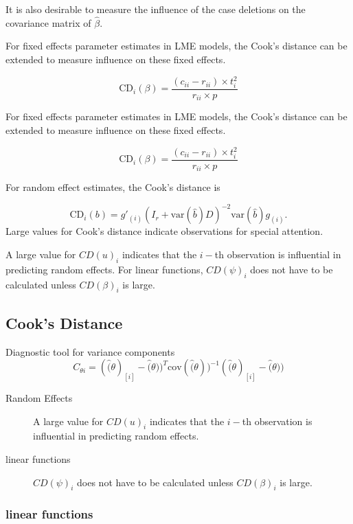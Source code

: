 \documentclass[12pt, a4paper]{report}
\theoremstyle{plain}
\theoremstyle{definition}
\theoremstyle{remark}
\begin{document}
It is also desirable to measure the influence of the case deletions on the covariance matrix of $\hat{\beta}$.

For fixed effects parameter estimates in LME models, the  Cook's distance can be extended to measure influence on these fixed effects.

\[
\mbox{CD}_{i}(\beta) = \frac{(c_{ii} - r_{ii}) \times t^2_{i}}{r_{ii} \times p}
\]


For fixed effects parameter estimates in LME models, the  Cook's distance can be extended to measure influence on these fixed effects.

\[
\mbox{CD}_{i}(\beta) = \frac{(c_{ii} - r_{ii}) \times t^2_{i}}{r_{ii} \times p}
\]

For random effect estimates, the  Cook's distance is

\[
\mbox{CD}_{i}(b) = g{\prime}_{(i)} (I_{r} + \mbox{var}(\hat{b})D)^{-2}\mbox{var}(\hat{b})g_{(i)}.
\]
Large values for Cook's distance indicate observations for special attention.

A large value for $CD(u)_i$ indicates that the $i-$th observation is influential in predicting random effects.
For linear functions, $CD(\psi)_i$ does not have to be calculated unless $CD(\beta)_i$ is large.


\subsection{Cook's Distance}

Diagnostic tool for variance components
\[ C_{\theta i} =(\hat(\theta)_{[i]} - \hat(\theta))^{T}\mbox{cov}( \hat(\theta))^{-1}(\hat(\theta)_{[i]} - \hat(\theta))\]

\begin{description}
	\item[Random Effects]	
	A large value for $CD(u)_i$ indicates that the $i-$th observation is influential in predicting random effects.
	\item[linear functions]
	$CD(\psi)_i$ does not have to be calculated unless $CD(\beta)_i$ is large.
\end{description}






\subsubsection{linear functions}
\end{document}
